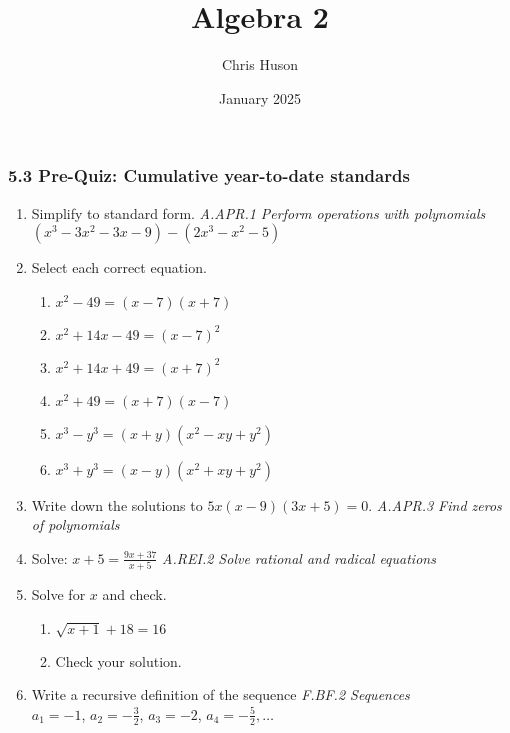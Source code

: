 \documentclass[12pt, twoside]{article}
\title{Algebra 2}
\author{Chris Huson}
\date{January 2025}
\begin{document}
\subsubsection*{5.3 Pre-Quiz: Cumulative year-to-date standards}
\begin{enumerate}[itemsep=0.5cm]

\item Simplify to standard form. \hfill \emph{A.APR.1 Perform operations with polynomials} \\[0.25cm]
$(x^3 - 3x^2 - 3x - 9) - (2x^3 - x^2 - 5)$ \vspace{2cm}

\item Select each correct equation.
\begin{multicols}{2}
    \begin{enumerate}
    \item $x^2 - 49 = (x-7)(x+7)$
    \item $x^2 + 14x - 49 = (x-7)^2$
    \item $x^2 + 14x + 49 = (x+7)^2$
    \item $x^2 + 49 = (x+7)(x-7)$
    \item \(x^3 - y^3 = (x + y)(x^2 - xy + y^2)\)
    \item \(x^3 + y^3 = (x - y)(x^2 + xy + y^2)\)
    \end{enumerate}
\end{multicols}

\item Write down the solutions to $5x(x - 9)(3x + 5) = 0$. \hfill \emph{A.APR.3 Find zeros of polynomials}
\vspace{2cm} 

\item Solve: $\displaystyle  x+5 = \frac{9x+37}{x+5}$ \hfill \emph{A.REI.2 Solve rational and radical equations} \vspace{3cm} 

\item Solve for $x$ and check.
    \begin{multicols}{2}
    \begin{enumerate}[itemsep=0.5cm]
        \item  $\sqrt{x + 1} + 18 = 16$
        \item Check your solution.
    \end{enumerate}
    \end{multicols}

\newpage
\item Write a recursive definition of the sequence \hfill \emph{F.BF.2 Sequences} \\[0.25cm]
$a_1 = -1$, $a_2 = -\frac{3}{2}$, $a_3 = -2$, $a_4 = -\frac{5}{2}, \ldots$ \vspace{2.5cm}


\end{enumerate}
\end{document}
